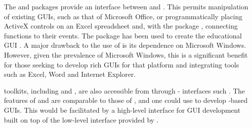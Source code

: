 \documentclass[article,shortnames]{jss}
\begin{document}
The  \citep{RDCOM} and  \citep{RDCOM2}
packages provide an interface between  and 
\citep{DCOM}. This permits manipulation of existing GUIs, such as that
of Microsoft Office, or programmatically placing ActiveX controls on
an Excel spreadsheet and, with the  package
\citep{RDCOMEvents}, connecting  functions to their
events.
 The
 package has been used to create the educational
 GUI  \citep{simpleR}. A major drawback to
the use of  is its dependence on Microsoft
Windows. However, given the prevalence of Microsoft Windows, this is a
significant benefit for those seeking to develop rich GUIs for that
platform and integrating tools such as Excel, Word and Internet
Explorer.

 toolkits, including  and , are
also accessible
from  through - interfaces such
\citep{rJava}. The features
of  and  are comparable to those of ,
and one could use  to develop -based
GUIs. This would be facilitated by a high-level interface for GUI
development built on top of the low-level interface provided by
. 
\end{document}
